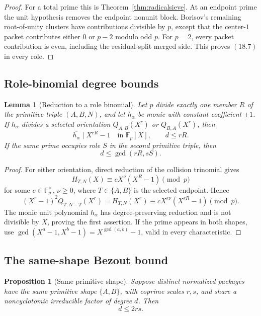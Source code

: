 \documentclass[11pt]{article}
\newtheorem{proposition}[theorem]{Proposition}
\newtheorem{lemma}[theorem]{Lemma}
\theoremstyle{definition}
\begin{document}
\begin{proof}
For a total prime this is Theorem~\ref{thm:radicalsieve}.  At an endpoint
prime the unit hypothesis removes the endpoint nonunit block.  Borisov's
remaining root-of-unity clusters have contributions divisible by \(p\),
except that the center-\(1\) packet contributes either \(0\) or \(p-2\)
modulo odd \(p\).  For \(p=2\), every packet contribution is even, including
the residual-split merged side.  This proves \((18.7)\) in every role.
\end{proof}

\subsection{Role-binomial degree bounds}

\begin{lemma}[Reduction to a role binomial]
\label{lem:rolebinomial}
Let \(p\) divide exactly one member \(R\) of the primitive triple
\((A,B,N)\), and let \(h_\alpha\) be monic with constant coefficient
\(\pm1\).  If \(h_\alpha\) divides a selected orientation
\(Q_{A,B}(X^r)\) or \(Q_{B,A}(X^r)\), then
\begin{equation}
 \overline{h_\alpha}\mid X^{rR}-1
 \quad\text{in }\mathbb F_p[X],
 \qquad d\leq rR.
 \tag{18.8}
\end{equation}
If the same prime occupies role \(S\) in the second primitive triple, then
\[
 d\leq\gcd(rR,sS).
\]
\end{lemma}

\begin{proof}
For either orientation, direct reduction of the collision trinomial gives
\[
 H_{T,N}(X)\equiv cX^\nu(X^R-1)\pmod p
\]
for some \(c\in\mathbb F_p^\times\), \(\nu\geq0\), where
\(T\in\{A,B\}\) is the selected endpoint.  Hence
\[
 (X^r-1)^2Q_{T,N-T}(X^r)=H_{T,N}(X^r)
 \equiv cX^{r\nu}(X^{rR}-1)\pmod p.
\]
The monic unit polynomial \(h_\alpha\) has degree-preserving reduction and is
not divisible by \(X\), proving the first assertion.  If the prime appears in
both shapes, use
\(\gcd(X^a-1,X^b-1)=X^{\gcd(a,b)}-1\), valid in every characteristic.
\end{proof}

\subsection{The same-shape Bezout bound}

\begin{proposition}[Same primitive shape]
\label{prop:sameshapebezout}
Suppose distinct normalized packages have the same primitive shape
\(\{A,B\}\), with coprime scales \(r,s\), and share a noncyclotomic
irreducible factor of degree \(d\).  Then
\begin{equation}
 d\leq2rs.
 \tag{18.9}
\end{equation}
\end{proposition}
\end{document}
